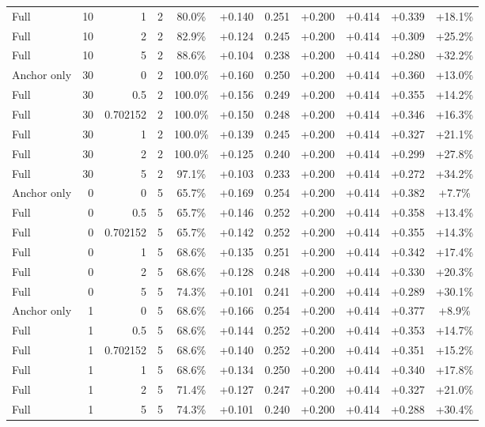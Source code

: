 \begin{table}[htbp]
\begin{tabular}{lrrrccccccc}
Full & 10 & 1 & 2 & 80.0\% & +0.140 & 0.251 & +0.200 & +0.414 & +0.339 & +18.1\% \\
Full & 10 & 2 & 2 & 82.9\% & +0.124 & 0.245 & +0.200 & +0.414 & +0.309 & +25.2\% \\
Full & 10 & 5 & 2 & 88.6\% & +0.104 & 0.238 & +0.200 & +0.414 & +0.280 & +32.2\% \\
Anchor only & 30 & 0 & 2 & 100.0\% & +0.160 & 0.250 & +0.200 & +0.414 & +0.360 & +13.0\% \\
Full & 30 & 0.5 & 2 & 100.0\% & +0.156 & 0.249 & +0.200 & +0.414 & +0.355 & +14.2\% \\
Full & 30 & 0.702152 & 2 & 100.0\% & +0.150 & 0.248 & +0.200 & +0.414 & +0.346 & +16.3\% \\
Full & 30 & 1 & 2 & 100.0\% & +0.139 & 0.245 & +0.200 & +0.414 & +0.327 & +21.1\% \\
Full & 30 & 2 & 2 & 100.0\% & +0.125 & 0.240 & +0.200 & +0.414 & +0.299 & +27.8\% \\
Full & 30 & 5 & 2 & 97.1\% & +0.103 & 0.233 & +0.200 & +0.414 & +0.272 & +34.2\% \\
Anchor only & 0 & 0 & 5 & 65.7\% & +0.169 & 0.254 & +0.200 & +0.414 & +0.382 & +7.7\% \\
Full & 0 & 0.5 & 5 & 65.7\% & +0.146 & 0.252 & +0.200 & +0.414 & +0.358 & +13.4\% \\
Full & 0 & 0.702152 & 5 & 65.7\% & +0.142 & 0.252 & +0.200 & +0.414 & +0.355 & +14.3\% \\
Full & 0 & 1 & 5 & 68.6\% & +0.135 & 0.251 & +0.200 & +0.414 & +0.342 & +17.4\% \\
Full & 0 & 2 & 5 & 68.6\% & +0.128 & 0.248 & +0.200 & +0.414 & +0.330 & +20.3\% \\
Full & 0 & 5 & 5 & 74.3\% & +0.101 & 0.241 & +0.200 & +0.414 & +0.289 & +30.1\% \\
Anchor only & 1 & 0 & 5 & 68.6\% & +0.166 & 0.254 & +0.200 & +0.414 & +0.377 & +8.9\% \\
Full & 1 & 0.5 & 5 & 68.6\% & +0.144 & 0.252 & +0.200 & +0.414 & +0.353 & +14.7\% \\
Full & 1 & 0.702152 & 5 & 68.6\% & +0.140 & 0.252 & +0.200 & +0.414 & +0.351 & +15.2\% \\
Full & 1 & 1 & 5 & 68.6\% & +0.134 & 0.250 & +0.200 & +0.414 & +0.340 & +17.8\% \\
Full & 1 & 2 & 5 & 71.4\% & +0.127 & 0.247 & +0.200 & +0.414 & +0.327 & +21.0\% \\
Full & 1 & 5 & 5 & 74.3\% & +0.101 & 0.240 & +0.200 & +0.414 & +0.288 & +30.4\% \\

\end{tabular}
\end{table}
